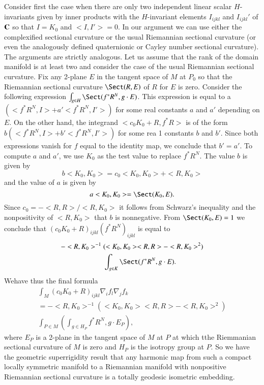 Consider first the case when there are only two independent linear scalar $H$-invariants given by inner products with the $H$-invariant elements $I_{ijkl}$ and $I_{ijkl}'$ of $\mathbf{C}$ so that $I =K_{0}$ and $ < I, I' > =0$. In our argument we can use either the complexified sectional curvature or the usual Riemannian sectional curvature (or even the analogously defined quaternionic or Cayley number sectional curvature). The arguments are strictly analogous. Let us assume that the rank of the domain manifold is at least two and consider the case of the usual Riemannian sectional curvature. Fix any 2-plane $E$ in the tangent space of $M$ at $P_{0}$ so that the Riemannian sectional curvature $\Sect(R, E)$ of $R$ for $E$ is zero. Consider the following expression $\int_{g \in H} \Sect(f^{*}R^{N}, g \cdot E)$. This expression is equal to a
$\left(< f^{*}R^{N}, I > + a'  < f^{*}R^{N}, I' >\right)$ for some real constants $a$ and $a'$ depending on $E$. On the other hand, the integrand $< c_{0}K_{0} + R, f^{*}R >$ is of the form $b\left(< f^{*}R^{N}, I > + b' < f^{*}R^{N}, I' >\right)$ for some rea 1 constants $b$ and $b'$. Since both expressions vanish for $f$ equal to the identity map, we conclude that $b' =a'$. To compute $a$ and $a'$,  we use $K_{0}$ as the test value to replace $f^{*}R^{N}$. The value $b$ is given by
$$
b < K_{0}, K_{0} > =c_{0}< K_{0}, K_{0} > + < R, K_{0} >
$$
and the value of $a$ is given by
$$
a < K_{0}, K_{0} > = \Sect(K_{0}, E).
$$
Since $c_{0}=-<R, R>/<R, K_{0}>$ it follows from Schwarz's inequality and the nonpositivity of $< R, K_{0}>$ that $b$ is nonnegative. From $\Sect(K_{0}, E) = 1$ we conclude that $(c_{0}K_{0} + R)_{ijkl}(f^{*}R^{N})_{ijkl}$ is equal to
\begin{equation*}
\begin{split}
&-< R, K_{0}>^{-1} (< K_{0}, K_{0}><R, R>-< R, K_{0}>^{2})\\
&\qquad \qquad \qquad \int_{g \in K} \Sect(f^{*}R^{N}, g\cdot E).
\end{split}
\end{equation*}
We\pageoriginale have thus the final formula
\begin{gather*}
\int_{M}(c_{0}K_{0}+ R)_{ijkl}\nabla_{i}f_{l}\nabla_{j}f_{k}\\
=-< R, K_{0}>^{-1}(<K_{0}, K_{0}><R, R>-<R, K_{0}>^{2})\\
\int_{P \in M}\left( \int_{g \in H_{P}} f^{*}R^{N}, g \cdot E_{P}\right),
\end{gather*}
where $E_{P}$ is a 2-plane in the tangent space of $M$ at $P$ at which tthe Riemmanian sectional curvature of $M$ is zero and $H_{P}$ is the isotropy group at $P$. So we have the geometric superrigidity result that  any harmonic map from such a compact locally symmetric manifold to a Riemannian manifold with nonpositive Riemannian sectional curvature is a totally geodesic isometric embedding.

